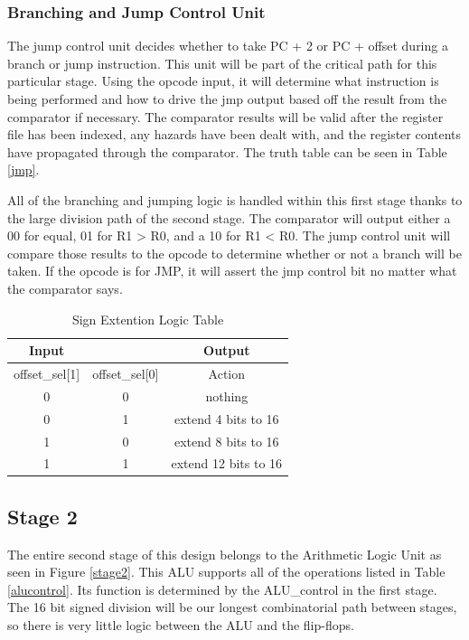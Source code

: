 	\subsubsection{Branching and Jump Control Unit}
    The jump control unit decides whether to take PC + 2 or PC + offset during a branch or jump instruction. 
    This unit will be part of the critical path for this particular stage. Using the opcode input, it will determine what instruction is being performed and how to drive the jmp output based off the result from the comparator if necessary. The comparator results will be valid after the register file has been indexed, any hazards have been dealt with, and the register contents have propagated through the comparator. The truth table can be seen in Table \ref{jmp}. 
    
    All of the branching and jumping logic is handled within this first stage thanks to the large division path of the second stage. The comparator will output either a 00 for equal, 
    01 for R1 > R0, and a 10 for R1 < R0. The jump control unit will compare those results to the opcode to determine whether or not a branch will be taken. If the opcode is for JMP, it will assert the jmp control bit no matter what the comparator says.
    
    \begin{table}[htbp]
        \caption{Sign Extention Logic Table}
        \label{signextend}
        \centering
        \begin{tabular}{c c | c }
        Input         &               & Output\\
        \hline
        offset\_sel[1] & offset\_sel[0] & Action\\
        0             & 0             & nothing\\
        0             & 1             & extend 4 bits to 16\\
        1             & 0             & extend 8 bits to 16\\
        1             & 1             & extend 12 bits to 16\\
        \end{tabular}
    \end{table}
        
    
    \subsection{Stage 2}
    The entire second stage of this design belongs to the Arithmetic Logic Unit as seen in Figure
    \ref{stage2}. This ALU supports all of the operations listed in Table \ref{alucontrol}. Its function is 
    determined by the ALU\_control in the first stage. The 16 bit signed division will be our longest combinatorial path between stages, so there is very little logic between the ALU and the flip-flops.  
    
